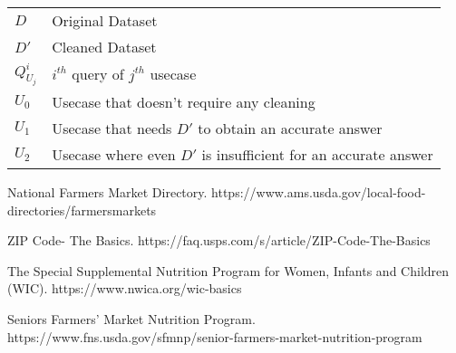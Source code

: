 \documentclass[10pt]{article}
\begin{document}
\begin{tabular}{ l l }
 $D$ & Original Dataset  \\ 
 $D'$ & Cleaned Dataset  \\
 $Q^{i}_{U_j}$ & $i^{th}$ query of $j^{th}$ usecase \\
 $U_0$ & Usecase that doesn't require any cleaning  \\
 $U_1$ & Usecase that needs $D'$ to obtain an accurate answer \\
 $U_2$ & Usecase where even $D'$ is insufficient for an accurate answer 
\end{tabular}

\begin{thebibliography}{10}

National Farmers Market Directory. 
https://www.ams.usda.gov/local-food-directories/farmersmarkets

ZIP Code\texttrademark - The Basics. 
https://faq.usps.com/s/article/ZIP-Code-The-Basics

The Special Supplemental Nutrition Program for Women, Infants and Children (WIC).
https://www.nwica.org/wic-basics

Seniors Farmers' Market Nutrition Program.
https://www.fns.usda.gov/sfmnp/senior-farmers-market-nutrition-program


\end{thebibliography}




\end{document}
